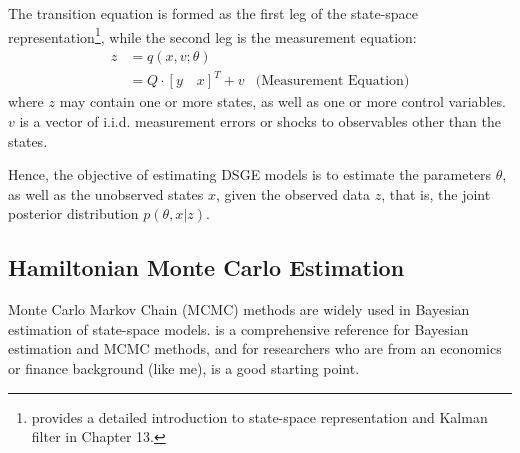 \documentclass[12pt]{article}
\begin{document}
The transition equation is formed as the first leg of the state-space representation\footnote{\citet{hamiltonTimeSeriesAnalysis1994} provides a detailed introduction to state-space representation and Kalman filter in Chapter 13.}, while the second leg is the measurement equation:
$$
\begin{aligned}
    z &= q(x,v;\theta)\\
    &=Q \cdot [y \quad x]^T + v &\text{(Measurement Equation)}
\end{aligned}
$$
where $z$ may contain one or more states, as well as one or more control variables. $v$ is a vector of i.i.d. measurement errors or shocks to observables other than the states.

Hence, the objective of estimating DSGE models is to estimate the parameters $\theta$, as well as the unobserved states $x$, given the observed data $z$, that is, the joint posterior distribution $p(\theta, x|z)$.

\subsection*{Hamiltonian Monte Carlo Estimation}
Monte Carlo Markov Chain (MCMC) methods are widely used in Bayesian estimation of state-space models. \citet{gelman2013bayesian} is a comprehensive reference for Bayesian estimation and MCMC methods, and for researchers who are from an economics or finance background (like me), \citet{johannesCHAPTER13MCMC2010} is a good starting point.
\end{document}

